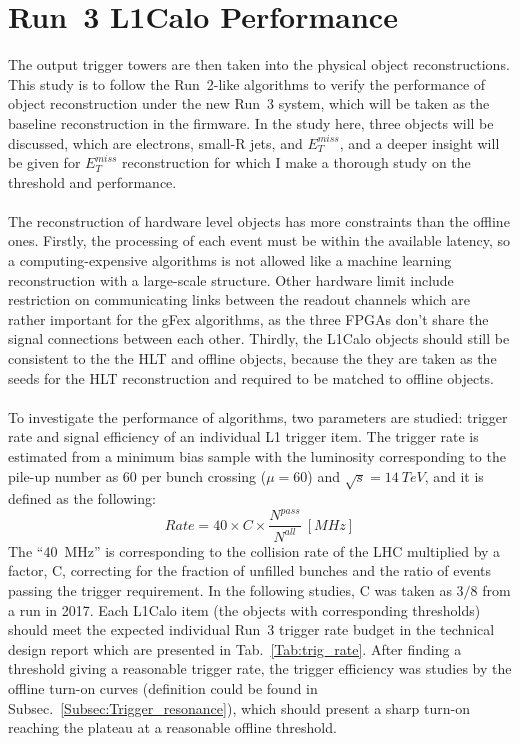 \section{Run~3 L1Calo Performance}
\label{Sec:Trig_obj}
The output trigger towers are then taken into the physical object reconstructions. This study is to follow the Run~2-like algorithms to verify the performance of object reconstruction under the new Run~3 system, which will be taken as the baseline reconstruction in the firmware. In the study here, three objects will be discussed, which are electrons, small-R jets, and $E^{miss}_{T}$, and a deeper insight will be given for $E^{miss}_{T}$ reconstruction for which I make a thorough study on the threshold and performance. 
\\
\\The reconstruction of hardware level objects has more constraints than the offline ones. Firstly, the processing of each event must be within the available latency, so a computing-expensive algorithms is not allowed like a machine learning reconstruction with a large-scale structure. Other hardware limit include restriction on communicating links between the readout channels which are rather important for the gFex algorithms, as the three FPGAs don't share the signal connections between each other. Thirdly, the L1Calo objects should still be consistent to the the HLT and offline objects, because the they are taken as the seeds for the HLT reconstruction and required to be matched to offline objects. 
\\
\\To investigate the performance of algorithms, two parameters are studied: trigger rate and signal efficiency of an individual L1 trigger item. The trigger rate is estimated from a minimum bias sample with the luminosity corresponding to the pile-up number as 60 per bunch crossing ($\mu=60$) and $\sqrt{s}=14~TeV$, and it is defined as the following:
\begin{equation}
Rate = 40\times C\times\frac{N^{pass}}{N^{all}}~[MHz]
\end{equation} 
The ``40~MHz'' is corresponding to the collision rate of the LHC multiplied by a factor, C, correcting for the fraction of unfilled bunches and the ratio of events passing the trigger requirement. In the following studies, C was taken as $3/8$ from a run in 2017. Each L1Calo item (the objects with corresponding thresholds) should meet the expected individual Run~3 trigger rate budget in the technical design report which are presented in Tab.~\ref{Tab:trig_rate}. After finding a threshold giving a reasonable trigger rate, the trigger efficiency was studies by the offline turn-on curves (definition could be found in Subsec.~\ref{Subsec:Trigger_resonance}), which should present a sharp turn-on reaching the plateau at a reasonable offline threshold. 
